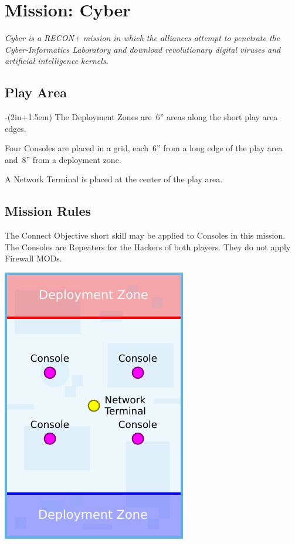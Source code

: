 \chapter{Mission: Cyber}

\emph{\emph{Cyber} is a RECON+ mission in which the alliances attempt
  to penetrate the Cyber-Informatics Laboratory and download
  revolutionary digital viruses and artificial intelligence kernels.}


\section{Play Area}
\vspace{-2\parskip}
\noindent\begin{stdminipage}{\linewidth-(2in+1.5em)}
\vspace{0pt}   
\noindent
The Deployment Zones are~6'' areas along the short
play area edges.

Four Consoles are placed in a grid, each~6'' from a long edge of the
play area and~8'' from a deployment zone.

A Network Terminal is placed at the center of the play area.

\section{Mission Rules}

The Connect Objective short skill may be applied to Consoles in this
mission.  The Consoles are Repeaters for the Hackers of both players.
They do not apply Firewall MODs.

\end{stdminipage}
\hfill
\begin{minipage}[t]{2in}\centering
\vspace{4pt}   
\includegraphics{maps/map-cyber}
\end{minipage}

